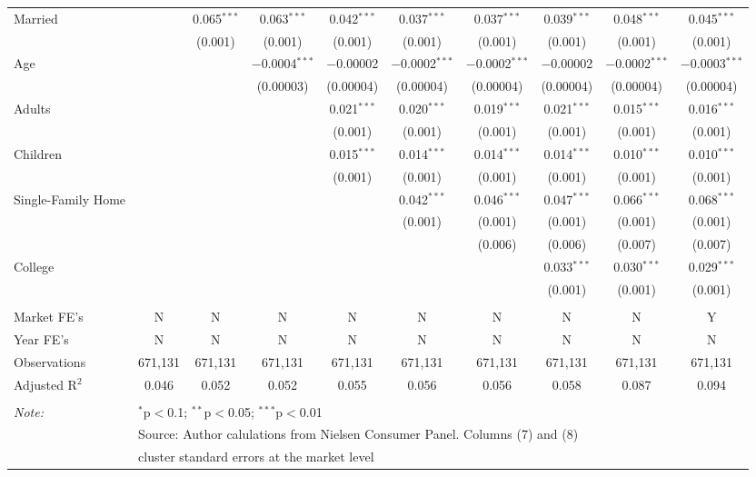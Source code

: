 \begin{table}[!htbp]
\begin{tabular}{@{\extracolsep{5pt}}lccccccccc}
  Married &  & 0.065$^{***}$ & 0.063$^{***}$ & 0.042$^{***}$ & 0.037$^{***}$ & 0.037$^{***}$ & 0.039$^{***}$ & 0.048$^{***}$ & 0.045$^{***}$ \\ 
  &  & (0.001) & (0.001) & (0.001) & (0.001) & (0.001) & (0.001) & (0.001) & (0.001) \\ 
  Age &  &  & $-$0.0004$^{***}$ & $-$0.00002 & $-$0.0002$^{***}$ & $-$0.0002$^{***}$ & $-$0.00002 & $-$0.0002$^{***}$ & $-$0.0003$^{***}$ \\ 
  &  &  & (0.00003) & (0.00004) & (0.00004) & (0.00004) & (0.00004) & (0.00004) & (0.00004) \\ 
  Adults &  &  &  & 0.021$^{***}$ & 0.020$^{***}$ & 0.019$^{***}$ & 0.021$^{***}$ & 0.015$^{***}$ & 0.016$^{***}$ \\ 
  &  &  &  & (0.001) & (0.001) & (0.001) & (0.001) & (0.001) & (0.001) \\ 
  Children &  &  &  & 0.015$^{***}$ & 0.014$^{***}$ & 0.014$^{***}$ & 0.014$^{***}$ & 0.010$^{***}$ & 0.010$^{***}$ \\ 
  &  &  &  & (0.001) & (0.001) & (0.001) & (0.001) & (0.001) & (0.001) \\ 
  Single-Family Home &  &  &  &  & 0.042$^{***}$ & 0.046$^{***}$ & 0.047$^{***}$ & 0.066$^{***}$ & 0.068$^{***}$ \\ 
  &  &  &  &  & (0.001) & (0.001) & (0.001) & (0.001) & (0.001) \\ 
  &  &  &  &  &  & (0.006) & (0.006) & (0.007) & (0.007) \\ 
  College &  &  &  &  &  &  & 0.033$^{***}$ & 0.030$^{***}$ & 0.029$^{***}$ \\ 
  &  &  &  &  &  &  & (0.001) & (0.001) & (0.001) \\ 
 \hline \\[-1.8ex] 
Market FE's & N & N & N & N & N & N & N & N & Y \\ 
Year FE's & N & N & N & N & N & N & N & N & N \\ 
Observations & 671,131 & 671,131 & 671,131 & 671,131 & 671,131 & 671,131 & 671,131 & 671,131 & 671,131 \\ 
Adjusted R$^{2}$ & 0.046 & 0.052 & 0.052 & 0.055 & 0.056 & 0.056 & 0.058 & 0.087 & 0.094 \\ 
\hline 
\hline \\[-1.8ex] 
\textit{Note:}  & \multicolumn{9}{l}{$^{*}$p$<$0.1; $^{**}$p$<$0.05; $^{***}$p$<$0.01} \\ 
 & \multicolumn{9}{l}{Source: Author calulations from Nielsen Consumer Panel. Columns (7) and (8) } \\ 
 & \multicolumn{9}{l}{cluster standard errors at the market level} \\ 
\end{tabular} 
\end{table} 
